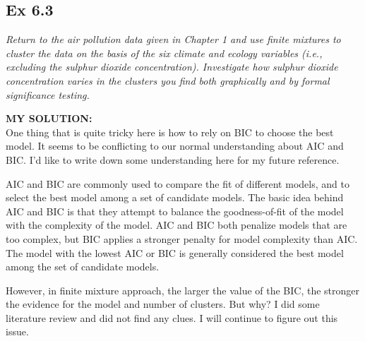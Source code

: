 \documentclass[
]{article}
\begin{document}
\hypertarget{ex-6.3}{%
\subsection{Ex 6.3}\label{ex-6.3}}

\emph{Return to the air pollution data given in Chapter 1 and use finite
mixtures to cluster the data on the basis of the six climate and ecology
variables (i.e., excluding the sulphur dioxide concentration).
Investigate how sulphur dioxide concentration varies in the clusters you
find both graphically and by formal significance testing.}

\textbf{MY SOLUTION:}\\
One thing that is quite tricky here is how to rely on BIC to choose the
best model. It seems to be conflicting to our normal understanding about
AIC and BIC. I'd like to write down some understanding here for my
future reference.

AIC and BIC are commonly used to compare the fit of different models,
and to select the best model among a set of candidate models. The basic
idea behind AIC and BIC is that they attempt to balance the
goodness-of-fit of the model with the complexity of the model. AIC and
BIC both penalize models that are too complex, but BIC applies a
stronger penalty for model complexity than AIC. The model with the
lowest AIC or BIC is generally considered the best model among the set
of candidate models.

However, in finite mixture approach, the larger the value of the BIC,
the stronger the evidence for the model and number of clusters. But why?
I did some literature review and did not find any clues. I will continue
to figure out this issue.
\end{document}
